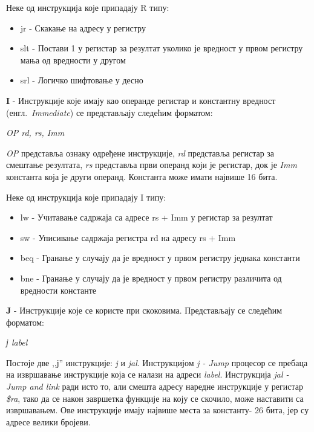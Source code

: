 \documentclass[12pt,oneside]{memoir}
\begin{document}
Неке од инструкција које припадају R типу:

\begin{itemize}
\item jr - Скакање на адресу у регистру
\item slt - Постави 1 у регистар за резултат уколико је вредност у првом регистру мања од вредности у другом
\item srl - Логичко шифтовање у десно
\end{itemize}

\textbf{I} - Инструкције које имају као операнде регистар и константну вредност (енгл.~\textit{Immediate}) се представљају следећим форматом:
\begin{listing}
\centering
\textit{OP rd, rs, Imm}
\end{listing}

\textit{OP} представља ознаку одређене инструкције, \textit{rd} представља регистар за смештање резултата, \textit{rs} представља први операнд који је регистар, док је \textit{Imm} константа која је други операнд. Константа може имати највише 16 бита.

Неке од инструкција које припадају I типу:

\begin{itemize}
\item lw - Учитавање садржаја са адресе rs + Imm у регистар за резултат
\item sw  - Уписивање садржаја регистра rd на адресу rs + Imm
\item beq - Гранање у случају да је вредност у првом регистру једнака константи
\item bne - Гранање у случају да је вредност у првом регистру различита од вредности константе
\end{itemize}

\textbf{J} - Инструкције које се користе при скоковима.
Представљају се следећим форматом:
\begin{listing}
\centering
\textit{ј label}
\end{listing}

Постоје две ,,ј'' инструкције: \textit{j} и \textit{jal}. Инструкцијом \textit{j - Jump }процесор се пребаца на извршавање инструкције која се налази на адреси \textit{label}. Инструкција \textit{jal - Jump and link} ради исто то, али смешта адресу наредне инструкције у регистар \textit{\$ra}, тако да се након завршетка функције на коју се скочило, може наставити са извршавањем. Ове инструкције имају највише места за константу- 26 бита, јер су адресе велики бројеви.
\end{document}
